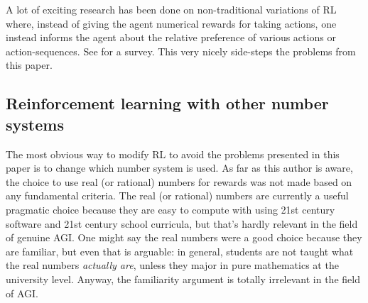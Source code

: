 \documentclass[reqno]{article}
\theoremstyle{definition}
\begin{document}
A lot of exciting research has been done on non-traditional variations
of RL where, instead of giving the agent numerical rewards for taking actions,
one instead informs the agent about the relative preference of various
actions or action-sequences. See \cite{wirth2017survey} for a survey.
This very nicely side-steps the problems from this paper.


\subsection{Reinforcement learning with other number systems}

The most obvious way to modify RL to avoid the problems presented in this
paper is to change which number system is used. As far as this author is aware,
the choice to use real (or rational) numbers for rewards was not made based
on any fundamental criteria. The real (or rational) numbers are currently a
useful pragmatic choice because they are easy to compute with using 21st
century software and 21st century school curricula, but that's hardly relevant
in the field of genuine AGI. One might
say the real numbers were a good choice because they are familiar, but even
that is arguable: in general, students are not taught what the
real numbers \emph{actually are},
unless they major in pure mathematics at the university level. Anyway,
the familiarity argument is totally irrelevant in the field of AGI.
\end{document}
